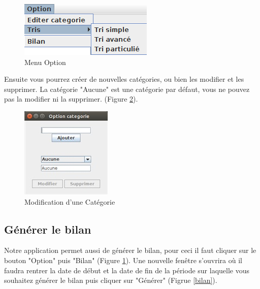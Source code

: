 \documentclass{article}
\begin{document}
\begin{figure}[h]
	\centering
	\includegraphics[scale=0.6]{images/MenuOption.png}
	\caption{Menu Option}
	\label{barre Opiton}
\end{figure}

Ensuite vous pourrez créer de nouvelles catégories, ou bien les modifier et les supprimer. La catégorie "Aucune" est une catégorie par défaut, vous ne pouvez pas la modifier ni la supprimer. (Figure \ref{modif Opiton}).

\begin{figure}[h]
	\centering
	\includegraphics[scale=0.8]{images/Capture_edit_categorie.jpg}
	\caption{Modification d'une Catégorie}
	\label{modif Opiton}
\end{figure}

\subsection{Générer le bilan}

Notre application permet aussi de générer le bilan, pour ceci il faut cliquer sur le bouton "Option" puis "Bilan" (Figure \ref{barre Opiton}).
Une nouvelle fenêtre s'ouvrira où il faudra rentrer la date de début et la date de fin de la période sur laquelle vous souhaitez générer le bilan puis cliquer sur "Générer" (Figrue \ref{bilan}).
\end{document}
